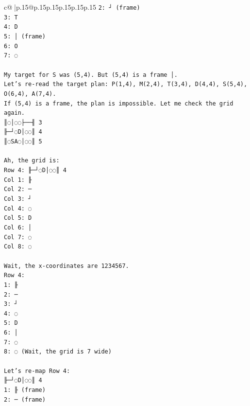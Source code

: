 \documentclass{article}
\begin{document}
{\begin{supertabular}{c@{$\;$}|p{.15\linewidth}@{}p{.15\linewidth}p{.15\linewidth}p{.15\linewidth}p{.15\linewidth}p{.15\linewidth}}
{{{\texttt{2: ┘ (frame)} \\
\texttt{3: T} \\
\texttt{4: D} \\
\texttt{5: │ (frame)} \\
\texttt{6: O} \\
\texttt{7: ◌} \\
\\ 
\texttt{My target for S was (5,4). But (5,4) is a frame │.} \\
\texttt{Let's re{-}read the target plan: P(1,4), M(2,4), T(3,4), D(4,4), S(5,4), O(6,4), A(7,4).} \\
\texttt{If (5,4) is a frame, the plan is impossible. Let me check the grid again.} \\
\texttt{║◌│◌◌├──╢ 3} \\
\texttt{╟─┘◌D│◌◌║ 4} \\
\texttt{║◌SA◌│◌◌║ 5} \\
\\ 
\texttt{Ah, the grid is:} \\
\texttt{Row 4: ╟─┘◌D│◌◌║ 4} \\
\texttt{Col 1: ╟} \\
\texttt{Col 2: ─} \\
\texttt{Col 3: ┘} \\
\texttt{Col 4: ◌} \\
\texttt{Col 5: D} \\
\texttt{Col 6: │} \\
\texttt{Col 7: ◌} \\
\texttt{Col 8: ◌} \\
\\ 
\texttt{Wait, the x{-}coordinates are 1234567.} \\
\texttt{Row 4:} \\
\texttt{1: ╟} \\
\texttt{2: ─} \\
\texttt{3: ┘} \\
\texttt{4: ◌} \\
\texttt{5: D} \\
\texttt{6: │} \\
\texttt{7: ◌} \\
\texttt{8: ◌ (Wait, the grid is 7 wide)} \\
\\ 
\texttt{Let's re{-}map Row 4:} \\
\texttt{╟─┘◌D│◌◌║ 4} \\
\texttt{1: ╟ (frame)} \\
\texttt{2: ─ (frame)} \\
}}}
\end{supertabular}}
\end{document}

